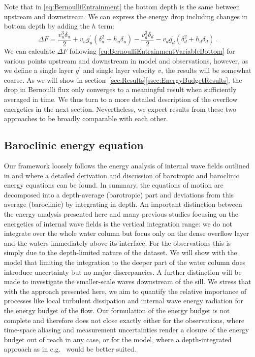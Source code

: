 \documentclass{ametsocV6.1}
\begin{document}
Note that in \eqref{eq:BernoulliEntrainment} the bottom depth is the same between upstream and downstream.
We can express the energy drop including changes in bottom depth by adding the $h$ term:
\begin{equation}
\Delta F = \frac{v_u^3 \delta_u}{2} + v_u g^\prime_u (\delta_u^2 + h_u \delta_u) - \frac{v_d^3 \delta_d}{2} -v_d g^\prime_d (\delta_d^2 + h_d \delta_d)\ .
\label{eq:BernoulliEntrainmentVariableBottom}
\end{equation}
We can calculate $\Delta F$ following \eqref{eq:BernoulliEntrainmentVariableBottom} for various points upstream and downstream in model and observations, however, as we define a single layer $g^\prime$ and single layer velocity $v$, the results will be somewhat coarse.
As we will show in section~\ref{sec:Results}\ref{ssec:EnergyBudgetResults}, the drop in Bernoulli flux only converges to a meaningful result when sufficiently averaged in time.
We thus turn to a more detailed description of the overflow energetics in the next section.
Nevertheless, we expect results from these two approaches to be broadly comparable with each other.

\subsection{Baroclinic energy equation}\label{sec:EnergyEquation}
Our framework loosely follows the energy analysis of internal wave fields outlined in \citet{kang10} and \citet{kangfringer11} where a detailed derivation and discussion of barotropic and baroclinic energy equations can be found.
In summary, the equations of motion are decomposed into a depth-average (barotropic) part and deviations from this average (baroclinic) by integrating in depth.
An important distinction between the energy analysis presented here and many previous studies focusing on the energetics of internal wave fields is the vertical integration range: we do not integrate over the whole water column but focus only on the dense overflow layer and the waters immediately above its interface.
For the observations this is simply due to the depth-limited nature of the dataset.
We will show with the model that limiting the integration to the deeper part of the water column does introduce uncertainty but no major discrepancies.
A further distinction will be made to investigate the smaller-scale waves downstream of the sill.
We stress that with the approach presented here, we aim to quantify the relative importance of processes like local turbulent dissipation and internal wave energy radiation for the energy budget of the flow.
Our formulation of the energy budget is not complete and therefore does not close exactly either for the observations, where time-space aliasing and measurement uncertainties render a closure of the energy budget out of reach in any case, or for the model, where a depth-integrated approach as in e.g.~\citet{kangfringer11} would be better suited.
\end{document}
